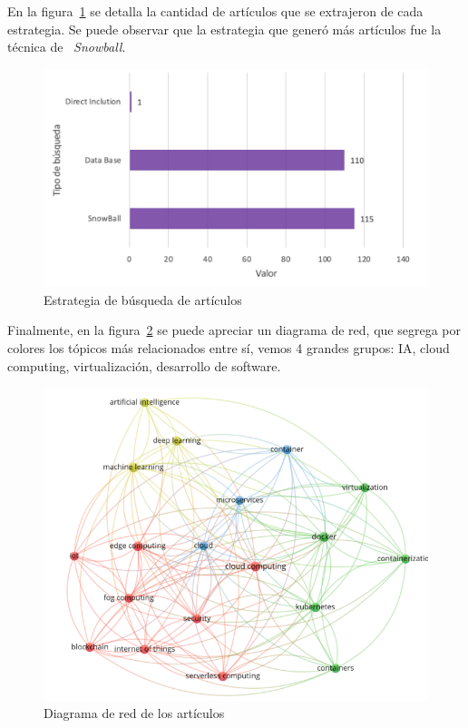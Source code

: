 En la figura~\ref{fig:estrategia-busqueda-articulos} se detalla la cantidad de artículos que se extrajeron de cada estrategia. Se puede observar que la estrategia que generó más artículos fue la técnica de ~\textit{Snowball}.
\begin{figure}[H]
    \centering
    \includegraphics[scale=0.8]{tablas-images/cp2/estrategia-busqueda-articulos.png}
    \caption{Estrategia de búsqueda de artículos}\label{fig:estrategia-busqueda-articulos}
\end{figure}

Finalmente, en la figura~\ref{fig:diagrama-red-articulos} se puede apreciar un diagrama de red, que segrega por colores los tópicos más relacionados entre sí, vemos 4 grandes grupos: IA, cloud computing, virtualización, desarrollo de software.
\begin{figure}[H]
    \centering
    \includegraphics[scale=0.9]{tablas-images/cp2/diagrama-red-busqueda.png}
    \caption{Diagrama de red de los artículos}\label{fig:diagrama-red-articulos}
\end{figure}